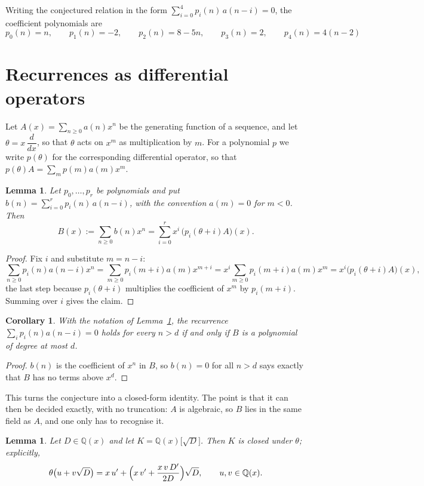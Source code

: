 \documentclass[11pt,a4paper]{article}
\theoremstyle{plain}
\newtheorem{lemma}[theorem]{Lemma}
\newtheorem{corollary}[theorem]{Corollary}
\theoremstyle{definition}
\begin{document}
Writing the conjectured relation in the form $\sum_{i=0}^{4}p_{i}(n)\,a(n-i)=0$,
the coefficient polynomials are
\[
p_{0}(n)=n,\qquad p_{1}(n)=-2,\qquad p_{2}(n)=8 - 5 n,\qquad p_{3}(n)=2,\qquad p_{4}(n)=4 \left(n - 2\right)
\]

\section{Recurrences as differential operators}

Let $A(x)=\sum_{n\ge0}a(n)x^{n}$ be the generating function of a sequence, and let
$\theta=x\,\dfrac{d}{dx}$, so that $\theta$ acts on $x^{m}$ as multiplication by $m$. For a
polynomial $p$ we write $p(\theta)$ for the corresponding differential operator, so that
$p(\theta)A=\sum_{m}p(m)a(m)x^{m}$.

\begin{lemma}\label{lem:transfer}
Let $p_{0},\dots,p_{r}$ be polynomials and put $b(n)=\sum_{i=0}^{r}p_{i}(n)\,a(n-i)$, with
the convention $a(m)=0$ for $m<0$. Then
\[
B(x):=\sum_{n\ge0}b(n)x^{n}=\sum_{i=0}^{r}x^{i}\,\bigl(p_{i}(\theta+i)A\bigr)(x).
\]
\end{lemma}

\begin{proof}
Fix $i$ and substitute $m=n-i$:
\[
\sum_{n\ge0}p_{i}(n)a(n-i)x^{n}=\sum_{m\ge0}p_{i}(m+i)a(m)x^{m+i}
=x^{i}\sum_{m\ge0}p_{i}(m+i)a(m)x^{m}=x^{i}\bigl(p_{i}(\theta+i)A\bigr)(x),
\]
the last step because $p_{i}(\theta+i)$ multiplies the coefficient of $x^{m}$ by
$p_{i}(m+i)$. Summing over $i$ gives the claim.
\end{proof}

\begin{corollary}\label{cor:criterion}
With the notation of Lemma~\ref{lem:transfer}, the recurrence
$\sum_{i}p_{i}(n)a(n-i)=0$ holds for every $n>d$ if and only if $B$ is a polynomial of
degree at most $d$.
\end{corollary}

\begin{proof}
$b(n)$ is the coefficient of $x^{n}$ in $B$, so $b(n)=0$ for all $n>d$ says exactly that
$B$ has no terms above $x^{d}$.
\end{proof}

This turns the conjecture into a closed-form identity. The point is that it can then be
decided exactly, with no truncation: $A$ is algebraic, so $B$ lies in the same field as
$A$, and one only has to recognise it.

\begin{lemma}\label{lem:field}
Let $D\in\mathbb{Q}(x)$ and let $K=\mathbb{Q}(x)\bigl[\sqrt{D}\bigr]$. Then $K$ is closed
under $\theta$; explicitly,
\[
\theta\bigl(u+v\sqrt{D}\bigr)=x\,u'+\Bigl(x\,v'+\frac{x\,v\,D'}{2D}\Bigr)\sqrt{D},
\qquad u,v\in\mathbb{Q}(x).
\]
\end{lemma}
\end{document}
